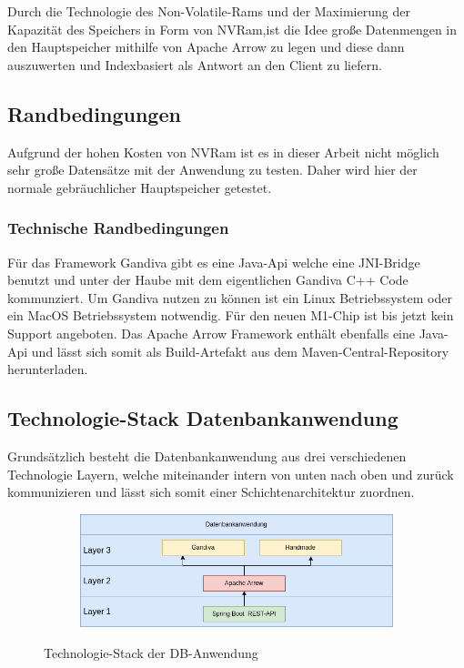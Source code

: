 Durch die Technologie des Non-Volatile-Rams und der Maximierung der Kapazität des Speichers in Form von NVRam,ist die Idee große Datenmengen in den Hauptspeicher mithilfe von Apache Arrow zu legen und diese dann auszuwerten und Indexbasiert als Antwort an den Client zu liefern.

\subsection{Randbedingungen}
Aufgrund der hohen Kosten von NVRam ist es in dieser Arbeit nicht möglich sehr große Datensätze mit der Anwendung zu testen. Daher wird hier der normale gebräuchlicher Hauptspeicher getestet.

\subsubsection{Technische Randbedingungen}
Für das Framework Gandiva gibt es eine Java-Api welche eine JNI-Bridge benutzt und unter der Haube mit dem eigentlichen Gandiva C++ Code kommunziert.
Um Gandiva nutzen zu können ist ein Linux Betriebssystem oder ein MacOS Betriebssystem notwendig. Für den neuen M1-Chip ist bis jetzt kein Support angeboten.
Das Apache Arrow Framework enthält ebenfalls eine Java-Api und lässt sich somit als Build-Artefakt aus dem Maven-Central-Repository herunterladen.


\subsection{Technologie-Stack Datenbankanwendung}

Grundsätzlich besteht die Datenbankanwendung aus drei verschiedenen Technologie Layern, welche miteinander intern von unten nach oben und zurück kommunizieren und lässt sich somit einer Schichtenarchitektur zuordnen. 


\begin{figure}[h]
  \centering
  \begin{subfigure}[b]{1.0\textwidth}
    \includegraphics[width=1.0\linewidth]{img/layerarch}
  \end{subfigure}
  \caption{Technologie-Stack der DB-Anwendung}
  \label{graf_1}
\end{figure}

